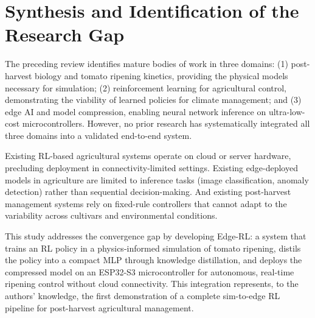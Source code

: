 
\section{Synthesis and Identification of the Research Gap}
    \label{sec:Research Gap}

    The preceding review identifies mature bodies of work in three domains: (1) post-harvest biology and tomato ripening kinetics, providing the physical models necessary for simulation; (2) reinforcement learning for agricultural control, demonstrating the viability of learned policies for climate management; and (3) edge AI and model compression, enabling neural network inference on ultra-low-cost microcontrollers. However, no prior research has systematically integrated all three domains into a validated end-to-end system.

    Existing RL-based agricultural systems operate on cloud or server hardware, precluding deployment in connectivity-limited settings. Existing edge-deployed models in agriculture are limited to inference tasks (image classification, anomaly detection) rather than sequential decision-making. And existing post-harvest management systems rely on fixed-rule controllers that cannot adapt to the variability across cultivars and environmental conditions.

    This study addresses the convergence gap by developing Edge-RL: a system that trains an RL policy in a physics-informed simulation of tomato ripening, distils the policy into a compact MLP through knowledge distillation, and deploys the compressed model on an ESP32-S3 microcontroller for autonomous, real-time ripening control without cloud connectivity. This integration represents, to the authors' knowledge, the first demonstration of a complete sim-to-edge RL pipeline for post-harvest agricultural management.
